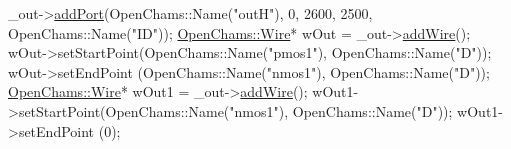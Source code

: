\begin{DoxyCodeInclude}
    \_out->\hyperlink{class_open_chams_1_1_net_af395a7c9d6f3c2b24500b91260873664}{addPort}(OpenChams::Name(\textcolor{stringliteral}{"outH"}), 0, 2600, 2500, OpenChams::Name(\textcolor{stringliteral}{"ID"}));
    \hyperlink{class_open_chams_1_1_wire}{OpenChams::Wire}* wOut = \_out->\hyperlink{class_open_chams_1_1_net_a643a969f62770301b8b70ed63c36a55e}{addWire}();
    wOut->setStartPoint(OpenChams::Name(\textcolor{stringliteral}{"pmos1"}), OpenChams::Name(\textcolor{stringliteral}{"D"}));
    wOut->setEndPoint  (OpenChams::Name(\textcolor{stringliteral}{"nmos1"}), OpenChams::Name(\textcolor{stringliteral}{"D"}));
    \hyperlink{class_open_chams_1_1_wire}{OpenChams::Wire}* wOut1 = \_out->\hyperlink{class_open_chams_1_1_net_a643a969f62770301b8b70ed63c36a55e}{addWire}();
    wOut1->setStartPoint(OpenChams::Name(\textcolor{stringliteral}{"nmos1"}), OpenChams::Name(\textcolor{stringliteral}{"D"}));
    wOut1->setEndPoint  (0);


\end{DoxyCodeInclude}
